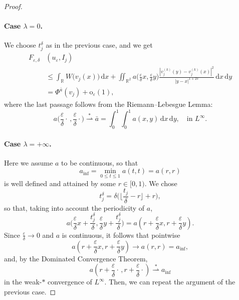 \documentclass{article}
\theoremstyle{definition}
\newcommand{\mr}{\mathrm}
\newcommand{\de}{\mathrm{d}}
\newcommand{\R}{\mathbb{R}}
\newcommand{\e}{\varepsilon}
\newcommand{\del}{\delta}
\def\e{\varepsilon}
\begin{document}
\begin{proof}
    \paragraph{Case $\lambda = 0$.}     
    We choose $t_j^\delta$ as in the previous case, and we get
     \begin{equation*}
      \begin{split}
             F_{\e,\delta}&(u_\e, I_j)\\
              &\leq\int_\R W\big(v_j(  x)\big) \,\de  x +\iint_{\R^2}a\Big( \frac{\e}{\del}x, \frac{\e}{\del}y \Big)\frac{|v_{j}^{(k)}(  y)-v^{(k)}_{j}( x)|^2}{|y-x|^{1+2s}} \,\de x\,\de y\\ 
                   &=\Phi^{\bar a}(v_j)+\mr o_\e(1),
      \end{split}
    \end{equation*}
where the last passage follows from the Riemann--Lebesgue Lemma:
$$a\Big(\frac{\e}{\delta}\cdot\,,\frac{\e}{\delta}\cdot\Big)\overset{*}{\rightharpoonup}  \bar a=\int_0^1\int_0^1a(x,y)\,\de x\,\de y, \quad\text{in } L^\infty.$$
  
    
    \paragraph{Case $\lambda = +\infty$.}
    Here we assume $a$ to be continuous, so that  
    \[a_{\inf} = \min_{0\leq t\leq 1} a(t,t)=a(r,r)\] 
    is well defined and attained by some $r\in [0,1)$. We chose
    \[t^\delta_j = \del\Big(\Big\lfloor\frac{t_j}{\delta}-r\Big\rfloor + r\Big),\] so that, taking into account the periodicity of $a$,  
    \[a\Big( \frac{\e}{\del}x+\frac{t^\delta_j}{\del}, \frac{\e}{\del}y+\frac{t^\delta_j}{\del}\Big)= a\left(r+ \frac{\e}{\delta}x, r+ \frac{\e}{\delta}y\right).\]
    Since $\frac{\e}{\delta} \rightarrow 0$ and $a$ is continuous, it follows that pointwise
    \[a\left(r+ \frac{\e}{\delta}x, r+ \frac{\e}{\delta}y\right) \rightarrow a(r,r) = a_{\inf},\]
    and, by the Dominated Convergence Theorem,
    \[a \left(r+ \frac{\e}{\delta}\cdot\, , r+ \frac{\e}{\delta}\cdot\right) \overset{*}{\rightharpoonup}  a_{\inf}\]
    in the weak-$*$ convergence of $L^\infty$. Then, we can repeat the argument of the previous case.
\end{proof}
\end{document}
